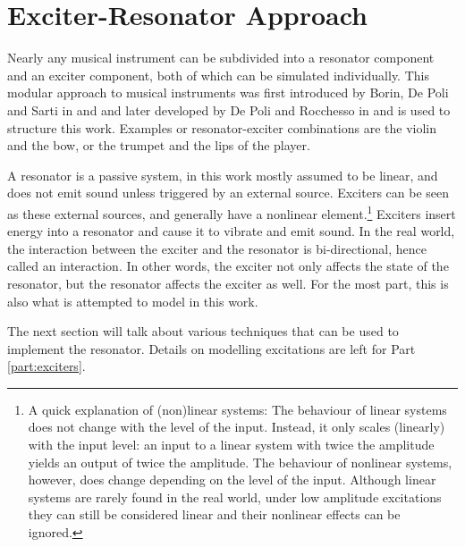 \section{Exciter-Resonator Approach}
Nearly any musical instrument can be subdivided into a resonator component and an exciter component, both of which can be simulated individually. This modular approach to musical instruments was first introduced by Borin, De Poli and Sarti in \cite{Borin1989} and and later developed by De Poli and Rocchesso in \cite{Poli1998} and is used to structure this work. Examples or resonator-exciter combinations are the violin and the bow, or the trumpet and the lips of the player. %

A resonator is a passive system, in this work mostly assumed to be linear, and does not emit sound unless triggered by an external source. Exciters can be seen as these external sources, and generally have a nonlinear element.\footnote{A quick explanation of (non)linear systems: The behaviour of linear systems does not change with the level of the input. Instead, it only scales (linearly) with the input level: an input to a linear system with twice the amplitude yields an output of twice the amplitude. The behaviour of nonlinear systems, however, does change depending on the level of the input. Although linear systems are rarely found in the real world, under low amplitude excitations they can still be considered linear and their nonlinear effects can be ignored.} Exciters insert energy into a resonator and cause it to vibrate and emit sound. In the real world, the interaction between the exciter and the resonator is bi-directional, hence called an interaction. In other words, the exciter not only affects the state of the resonator, but the resonator affects the exciter as well. For the most part, this is also what is attempted to model in this work.

The next section will talk about various techniques that can be used to implement the resonator. Details on modelling excitations are left for Part \ref{part:exciters}.

